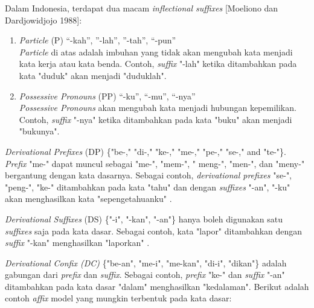 Dalam Indonesia, terdapat dua macam \textit{inflectional suffixes} [Moeliono dan Dardjowidjojo 1988]:
\begin{enumerate}[leftmargin=*]
	\item \textit{Particle} (P) {“-kah”, ”-lah”, ”-tah”, “-pun”}\\
	\textit{Particle }di atas adalah imbuhan yang tidak akan mengubah kata 
	menjadi kata kerja atau kata benda. Contoh, \textit{suffix }"-lah" 
	ketika ditambahkan pada kata "duduk" akan menjadi "duduklah".
	\item \textit{Possessive Pronouns} (PP) {“-ku”, “-mu”, “-nya”}\\
	\textit{Possessive Pronouns }akan mengubah kata menjadi hubungan 
	kepemilikan. Contoh, \textit{suffix} "-nya" ketika ditambahkan pada 
	kata "buku" akan menjadi "bukunya".
\end{enumerate}

\textit{Derivational Prefixes }(DP) \{"be-," "di-," "ke-," 
"me-," "pe-," "se-," and "te-"\}. \textit{Prefix }"me-" dapat muncul sebagai "me-", "mem-", " meng-", "men-", dan "meny-" bergantung dengan kata dasarnya. Sebagai contoh, \textit{derivational prefixes} "se-", "peng-", "ke-" ditambahkan pada kata "tahu" dan dengan \textit{suffixes }"-an", "-ku" akan menghasilkan kata "sepengetahuanku" \cite{12}.

\textit{Derivational Suffixes} (DS)\textit{ }\{"-i", "-kan", 
"-an"\} hanya boleh digunakan satu \textit{suffixes} saja pada kata 
dasar. Sebagai contoh, kata "lapor" ditambahkan dengan \textit{suffix
} "-kan" menghasilkan "laporkan" \cite{12}.

\textit{Derivational Confix (DC) }\{"be-an", "me-i", "me-kan", 
"di-i", "dikan"\} adalah gabungan dari \textit{prefix }dan
\textit{ suffix}. Sebagai contoh, \textit{prefix }"ke-" dan 
\textit{suffix }"-an" ditambahkan pada kata dasar "dalam" 
menghasilkan "kedalaman". Berikut adalah contoh \textit{affix }model 
yang mungkin terbentuk pada kata dasar:

